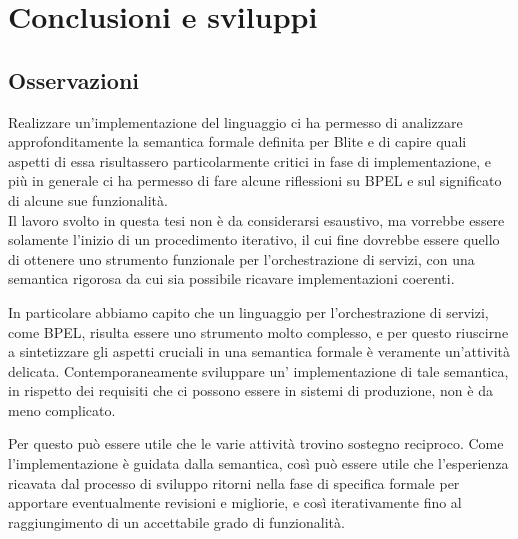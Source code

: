 \chapter{Conclusioni e sviluppi}

\section{Osservazioni}

Realizzare un'implementazione del linguaggio ci ha permesso di analizzare
approfonditamente la semantica formale definita per Blite e di capire quali
aspetti di essa risultassero particolarmente critici in fase di implementazione,
e più in generale ci ha permesso di fare alcune riflessioni su BPEL e
sul significato di alcune sue funzionalità.
\\

Il lavoro svolto in questa tesi non è da considerarsi esaustivo, 
ma vorrebbe essere solamente l'inizio di un procedimento iterativo, il cui fine
dovrebbe essere quello di ottenere uno strumento funzionale per
l'orchestrazione di servizi, con una semantica rigorosa da cui sia possibile
ricavare implementazioni coerenti. 

In particolare abbiamo capito che un linguaggio per l'orchestrazione di servizi,
come BPEL, risulta essere uno strumento molto complesso, e per questo
riuscirne a sintetizzare gli aspetti cruciali in una semantica formale è
veramente un'attività delicata. Contemporaneamente sviluppare un'
implementazione di tale semantica, in rispetto dei requisiti che ci possono
essere in sistemi di produzione, non è da meno complicato. 

Per questo può essere utile che le varie attività trovino sostegno reciproco.
Come l'implementazione è guidata dalla semantica, così può essere utile che
l'esperienza ricavata dal processo di sviluppo ritorni nella fase di specifica
formale per apportare eventualmente revisioni e migliorie, e così
iterativamente fino al raggiungimento di un accettabile grado di funzionalità.
\\

% 


